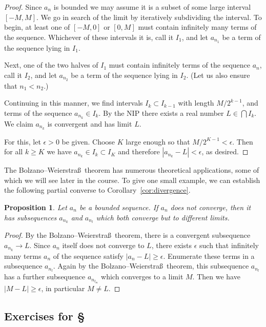 \documentclass[11pt,oneside]{amsbook}
\theoremstyle{definition}
\theoremstyle{plain}
\newtheorem{proposition}[theorem]{Proposition}
\theoremstyle{definition}
\theoremstyle{remark}
\numberwithin{equation}{section}
\numberwithin{figure}{section}
\begin{document}
\begin{proof}
  Since $a_n$ is bounded we may assume it is a subset of some large interval $[-M,M]$. We go in search of the limit by iteratively subdividing the interval. To begin, at least one of $[-M,0]$ or $[0,M]$ must contain infinitely many terms of the sequence. Whichever of these intervals it is, call it $I_1$, and let $a_{n_1}$ be a term of the sequence lying in $I_1$.

  Next, one of the two halves of $I_1$ must contain infinitely terms of the sequence $a_n$, call it $I_2$, and let $a_{n_2}$ be a term of the sequence lying in $I_2$. (Let us also ensure that $n_1<n_2$.)

  Continuing in this manner, we find intervals $I_k\subset I_{k-1}$ with length $M/2^{k-1}$, and terms of the sequence $a_{n_k}\in I_k$. By the NIP there exists a real number $L\in\bigcap I_k$. We claim $a_{n_k}$ is convergent and has limit $L$.

  For this, let $\epsilon>0$ be given. Choose $K$ large enough so that $M/2^{K-1}<\epsilon$. Then for all $k\geq K$ we have $a_{n_k}\in I_k\subset I_K$ and therefore $|a_{n_k}-L|<\epsilon$, as desired.
\end{proof}

The Bolzano--Weierstra\ss\ theorem has numerous theoretical applications, some of which we will see later in the course. To give one small example, we can establish the following partial converse to Corollary~\ref{cor:divergence}.

\begin{proposition}
  Let $a_n$ be a bounded sequence. If $a_n$ does not converge, then it has subsequences $a_{n_k}$ and $a_{n_l}$ which both converge but to different limits.
\end{proposition}

\begin{proof}
  By the Bolzano--Weierstra\ss\ theorem, there is a convergent subsequence $a_{n_k}\to L$. Since $a_n$ itself does not converge to $L$, there exists $\epsilon$ such that infinitely many terms $a_n$ of the sequence satisfy $|a_n-L|\geq\epsilon$. Enumerate these terms in a subsequence $a_{n_l}$. Again by the Bolzano--Weierstra\ss\ theorem, this subsequence $a_{n_l}$ has a further subsequence $a_{n_{l_m}}$ which converges to a limit $M$. Then we have $|M-L|\geq\epsilon$, in particular $M\neq L$.
\end{proof}

\newpage
\subsection*{Exercises for \S \thesection}
\end{document}
